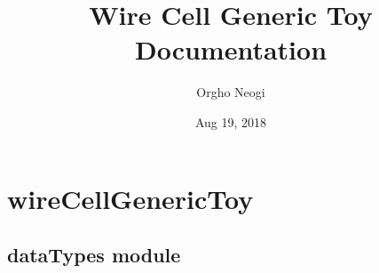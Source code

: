 \documentclass[letterpaper,10pt,english]{sphinxmanual}
\title{Wire Cell Generic Toy Documentation}
\date{Aug 19, 2018}
\author{Orgho Neogi}
\begin{document}
\maketitle
\sphinxtableofcontents
{}\label{\detokenize{index::doc}}



\chapter{wireCellGenericToy}
\label{\detokenize{modules:wirecellgenerictoy}}\label{\detokenize{modules::doc}}

\section{dataTypes module}
\label{\detokenize{dataTypes:module-dataTypes}}\label{\detokenize{dataTypes:datatypes-module}}\label{\detokenize{dataTypes::doc}}
\end{document}
